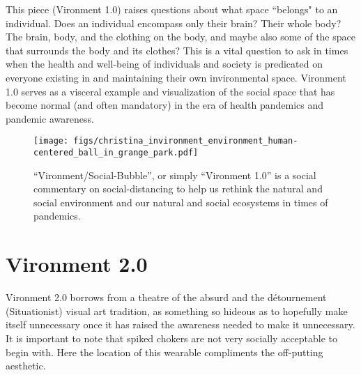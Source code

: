 \documentclass[journal]{journal}
\begin{document}
This piece (Vironment 1.0) raises questions about what space ``belongs" to an individual. Does an individual encompass only their brain? Their whole body? The brain, body, and the clothing on the body, and maybe also some of the space that surrounds the body and its clothes?  This is a vital question to ask in times when the health and well-being of individuals and society is predicated on everyone existing in and maintaining their own invironmental space.  Vironment 1.0 serves as a visceral example and visualization of the social space that has become normal (and often mandatory) in the era of health pandemics and pandemic awareness.

\begin{figure}
    \centering
    \texttt{[image: figs/christina\_invironment\_environment\_human-centered\_ball\_in\_grange\_park.pdf]}
    \caption{``Vironment/Social-Bubble'', or simply ``Vironment 1.0'' is a social commentary on social-distancing to help us rethink the natural and social environment and our natural and social ecosystems in times of pandemics.}
    \label{fig:vironment}
\end{figure}



\section{Vironment 2.0}
Vironment 2.0 borrows from a theatre of the absurd and the d\'{e}tournement (Situationist)
visual art tradition, as something so hideous as to hopefully make itself unnecessary once it has raised the awareness needed to make it unnecessary.  It is important to note that spiked chokers are not very socially acceptable to begin with.  Here the location of this wearable compliments the off-putting aesthetic\cite{zeagler2017wear}.
\end{document}
